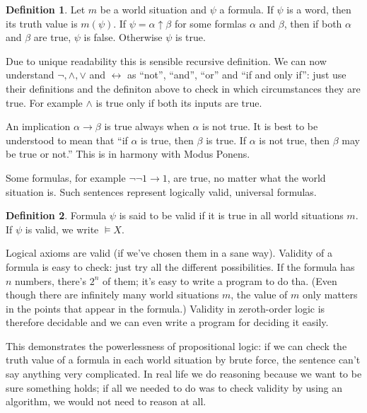 \documentclass[11pt,oneside,%
]{memoir}
\theoremstyle{definition}
\newtheorem{maaritelma}{Definition}
\begin{document}
\begin{maaritelma}
Let \(m\) be a world situation and \(\psi\) a formula. If \(\psi\) is a word, then its truth value is \(m(\psi)\). If \(\psi=\alpha\uparrow\beta\) for some formlas \(\alpha\) and \(\beta\), then if both \(\alpha\) and \(\beta\) are true, \(\psi\) is false. Otherwise \(\psi\) is true.
\end{maaritelma}
Due to unique readability this is sensible recursive definition. We can now understand \(\neg,\wedge,\vee\) and \(\leftrightarrow\) as ``not'', ``and'', ``or'' and ``if and only if'': just use their definitions and the definiton above to check in which circumstances they are true. For example \(\wedge\) is true only if both its inputs are true.

An implication \(\alpha\rightarrow\beta\) is true always when \(\alpha\) is not true. It is best to be understood to mean that ``if \(\alpha\) is true, then \(\beta\) is true. If \(\alpha\) is not true, then \(\beta\) may be true or not.'' This is in harmony with Modus Ponens.

Some formulas, for example \(\neg\neg1\rightarrow1\), are true, no matter what the world situation is. Such sentences represent logically valid, universal formulas.
\begin{maaritelma}
Formula \(\psi\) is said to be valid if it is true in all world situations \(m\). If \(\psi\) is valid, we write \(\vDash X\).
\end{maaritelma}
Logical axioms are valid (if we've chosen them in a sane way). Validity of a formula is easy to check: just try all the different possibilities. If the formula has \(n\) numbers, there's \(2^n\) of them; it's easy to write a program to do tha. (Even though there are infinitely many world situations \(m\), the value of \(m\) only matters in the points that appear in the formula.) Validity in zeroth-order logic is therefore decidable and we can even write a program for deciding it easily.

This demonstrates the powerlessness of propositional logic: if we can check the truth value of a formula in each world situation by brute force, the sentence can't say anything very complicated. In real life we do reasoning because we want to be sure something holds; if all we needed to do was to check validity by using an algorithm, we would not need to reason at all.
\end{document}
